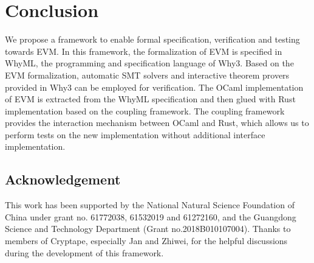 \documentclass[runningheads]{llncs}
\begin{document}
\section{Conclusion}\label{Sec: Conclusion}
We propose a framework to enable formal specification, verification and testing towards EVM. In this framework, the formalization of EVM is specified in WhyML, the programming and specification language of Why3. Based on the EVM formalization, automatic SMT solvers and interactive theorem provers provided in Why3 can be employed for verification. The OCaml implementation of EVM is extracted from the WhyML specification and then glued with Rust implementation based on the coupling framework. The coupling framework provides the interaction mechanism between OCaml and Rust, which allows us to perform tests on the new implementation without additional interface implementation.

\subsection*{Acknowledgement}
\noindent This work has been supported by the National Natural Science Foundation of China under grant no. 61772038, 61532019 and 61272160, and the Guangdong Science and Technology Department (Grant no.2018B010107004). Thanks to members of Cryptape, especially Jan and Zhiwei, for the helpful discussions during the development of this framework.




\end{document}
